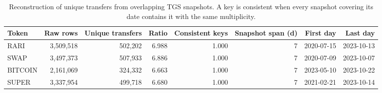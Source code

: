 \begin{table}[t]
\centering
\small
\caption{Reconstruction of unique transfers from overlapping TGS snapshots. A key is consistent when every snapshot covering its date contains it with the same multiplicity.}
\label{tab:dedup}
\begin{tabular}{lrrrrrrr}
\toprule
Token & Raw rows & Unique transfers & Ratio & Consistent keys & Snapshot span (d) & First day & Last day \\
\midrule
RARI & 3{,}509{,}518 & 502{,}202 & 6.988 & 1.000 & 7 & 2020-07-15 & 2023-10-13 \\
SWAP & 3{,}497{,}373 & 507{,}933 & 6.886 & 1.000 & 7 & 2020-07-09 & 2023-10-07 \\
BITCOIN & 2{,}161{,}069 & 324{,}332 & 6.663 & 1.000 & 7 & 2023-05-10 & 2023-10-22 \\
SUPER & 3{,}337{,}954 & 499{,}718 & 6.680 & 1.000 & 7 & 2021-02-21 & 2023-10-14 \\
\bottomrule
\end{tabular}
\end{table}
